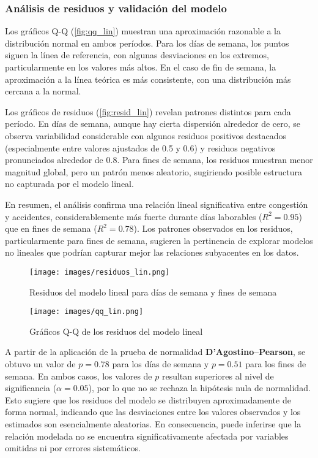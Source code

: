 \documentclass[12pt]{article}
\begin{document}
\subsubsection{Análisis de residuos y validación del modelo}

Los gráficos Q-Q (\autoref{fig:qq_lin}) muestran una aproximación razonable a la distribución normal en ambos períodos. Para los días de semana, los puntos siguen la línea de referencia, con algunas desviaciones en los extremos, particularmente en los valores más altos. En el caso de fin de semana, la aproximación a la línea teórica es más consistente, con una distribución más cercana a la normal.

Los gráficos de residuos (\autoref{fig:resid_lin}) revelan patrones distintos para cada período. En días de semana, aunque hay cierta dispersión alrededor de cero, se observa variabilidad considerable con algunos residuos positivos destacados (especialmente entre valores ajustados de 0.5 y 0.6) y residuos negativos pronunciados alrededor de 0.8. Para fines de semana, los residuos muestran menor magnitud global, pero un patrón menos aleatorio, sugiriendo posible estructura no capturada por el modelo lineal.

En resumen, el análisis confirma una relación lineal significativa entre congestión y accidentes, considerablemente más fuerte durante días laborables ($R^2 = 0.95$) que en fines de semana ($R^2 = 0.78$). Los patrones observados en los residuos, particularmente para fines de semana, sugieren la pertinencia de explorar modelos no lineales que podrían capturar mejor las relaciones subyacentes en los datos.


\begin{figure}[H]
\centering
\texttt{[image: images/residuos\_lin.png]}
\caption{Residuos del modelo lineal para días de semana y fines de semana}
\label{fig:resid_lin}
\end{figure}

\begin{figure}[H]
\centering
\texttt{[image: images/qq\_lin.png]}
\caption{Gráficos Q-Q de los residuos del modelo lineal}
\label{fig:qq_lin}
\end{figure}


A partir de la aplicación de la prueba de normalidad \textbf{D'Agostino–Pearson}, se obtuvo un valor de $p = 0.78$ para los días de semana y $p = 0.51$ para los fines de semana. En ambos casos, los valores de $p$ resultan superiores al nivel de significancia ($\alpha = 0.05$), por lo que no se rechaza la hipótesis nula de normalidad. Esto sugiere que los residuos del modelo se distribuyen aproximadamente de forma normal, indicando que las desviaciones entre los valores observados y los estimados son esencialmente aleatorias. En consecuencia, puede inferirse que la relación modelada no se encuentra significativamente afectada por variables omitidas ni por errores sistemáticos.
\end{document}
